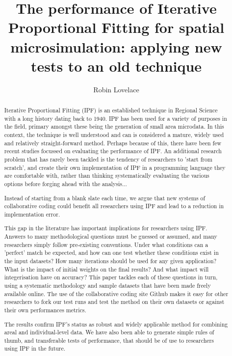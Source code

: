 \documentclass[a4paper,10pt]{article}
\title{The performance of Iterative Proportional Fitting for spatial microsimulation: applying new tests to an old technique}
\author{Robin Lovelace}
\begin{document}
\maketitle

\begin{abstract}
Iterative Proportional Fitting (IPF)
is an established technique in Regional Science with a long history dating back to 1940. 
IPF has been used for a variety of purposes in the field, primary amongst these being 
the generation of small area microdata.  
In this context, the technique is well understood and can is considered a mature, 
widely used and relatively straight-forward method. Perhaps because of this, there have been few
recent studies focussed on evaluating the performance of IPF. 
An additional research problem that has rarely been tackled is the tendency of 
researchers to 'start from scratch', and create their own implementation of 
IPF in a programming language they are comfortable with, rather than thinking 
systematically evaluating the various options before forging ahead with the analysis...

Instead of starting from a blank slate each time, we argue that new systems of collaborative coding could benefit all researchers using IPF and lead to a reduction in implementation error. 

This gap in the literature has important implications for researchers using IPF. Answers to many methodological questions must be guessed or assumed, and many researchers simply follow pre-existing conventions. Under what conditions can a 'perfect' match be expected, and how can one test whether these conditions exist in the input datasets?  How many iterations should be used for any given application? What is the impact of initial weights on the final results? And what impact will integerisation have on accuracy?  This paper tackles each of these questions in turn, using a systematic methodology and sample datasets that have been made freely available online. The use of the collaborative coding site Github makes it easy for other researchers to fork our test runs and test the method on their own datasets or against their own performances metrics.

The results confirm IPF's status as robust and widely applicable method for combining areal and individual-level data.  We have also been able to generate simple rules of thumb, and transferable tests of performance, that should be of use to researchers using IPF in the future.
\end{abstract}

\section{}
\end{document}
